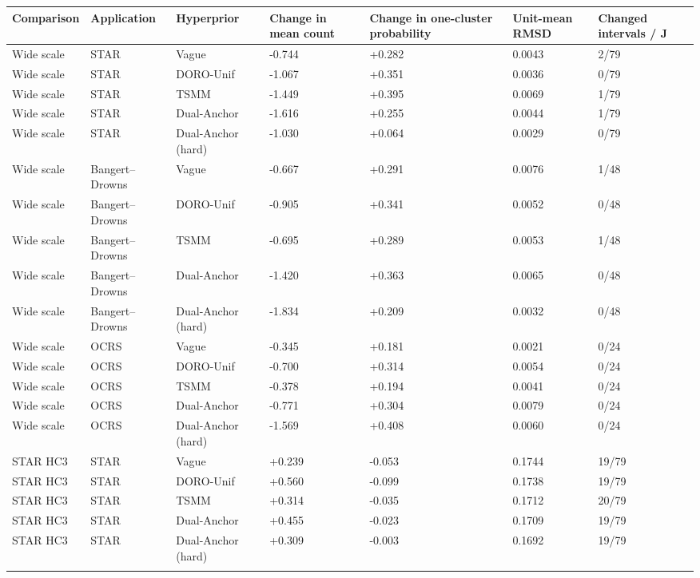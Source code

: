 \begin{longtable}{lllllll}
\toprule
Comparison & Application & Hyperprior & Change in mean count & Change in one-cluster probability & Unit-mean RMSD & Changed intervals / J \\
\midrule\endhead
Wide scale & STAR & Vague & -0.744 & +0.282 & 0.0043 & 2/79 \\ \addlinespace[3pt]
Wide scale & STAR & DORO-Unif & -1.067 & +0.351 & 0.0036 & 0/79 \\ \addlinespace[3pt]
Wide scale & STAR & TSMM & -1.449 & +0.395 & 0.0069 & 1/79 \\ \addlinespace[3pt]
Wide scale & STAR & Dual-Anchor & -1.616 & +0.255 & 0.0044 & 1/79 \\ \addlinespace[3pt]
Wide scale & STAR & Dual-Anchor (hard) & -1.030 & +0.064 & 0.0029 & 0/79 \\ \addlinespace[3pt]
Wide scale & Bangert--Drowns & Vague & -0.667 & +0.291 & 0.0076 & 1/48 \\ \addlinespace[3pt]
Wide scale & Bangert--Drowns & DORO-Unif & -0.905 & +0.341 & 0.0052 & 0/48 \\ \addlinespace[3pt]
Wide scale & Bangert--Drowns & TSMM & -0.695 & +0.289 & 0.0053 & 1/48 \\ \addlinespace[3pt]
Wide scale & Bangert--Drowns & Dual-Anchor & -1.420 & +0.363 & 0.0065 & 0/48 \\ \addlinespace[3pt]
Wide scale & Bangert--Drowns & Dual-Anchor (hard) & -1.834 & +0.209 & 0.0032 & 0/48 \\ \addlinespace[3pt]
Wide scale & OCRS & Vague & -0.345 & +0.181 & 0.0021 & 0/24 \\ \addlinespace[3pt]
Wide scale & OCRS & DORO-Unif & -0.700 & +0.314 & 0.0054 & 0/24 \\ \addlinespace[3pt]
Wide scale & OCRS & TSMM & -0.378 & +0.194 & 0.0041 & 0/24 \\ \addlinespace[3pt]
Wide scale & OCRS & Dual-Anchor & -0.771 & +0.304 & 0.0079 & 0/24 \\ \addlinespace[3pt]
Wide scale & OCRS & Dual-Anchor (hard) & -1.569 & +0.408 & 0.0060 & 0/24 \\ \addlinespace[3pt]
STAR HC3 & STAR & Vague & +0.239 & -0.053 & 0.1744 & 19/79 \\ \addlinespace[3pt]
STAR HC3 & STAR & DORO-Unif & +0.560 & -0.099 & 0.1738 & 19/79 \\ \addlinespace[3pt]
STAR HC3 & STAR & TSMM & +0.314 & -0.035 & 0.1712 & 20/79 \\ \addlinespace[3pt]
STAR HC3 & STAR & Dual-Anchor & +0.455 & -0.023 & 0.1709 & 19/79 \\ \addlinespace[3pt]
STAR HC3 & STAR & Dual-Anchor (hard) & +0.309 & -0.003 & 0.1692 & 19/79 \\ \addlinespace[3pt]
\bottomrule\end{longtable}
